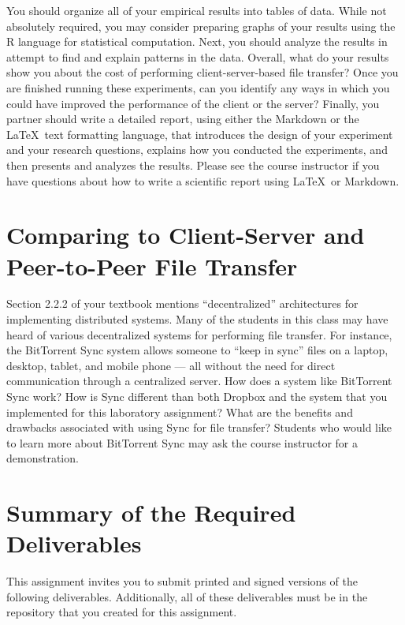You should organize all of your empirical results into tables of data. While not absolutely required, you may consider
preparing graphs of your results using the R language for statistical computation. Next, you should analyze the results
in attempt to find and explain patterns in the data. Overall, what do your results show you about the cost of performing
client-server-based file transfer? Once you are finished running these experiments, can you identify any ways in which
you could have improved the performance of the client or the server? Finally, you partner should write a detailed
report, using either the Markdown or the \LaTeX~text formatting language, that introduces the design of your experiment
and your research questions, explains how you conducted the experiments, and then presents and analyzes the results.
Please see the course instructor if you have questions about how to write a scientific report using \LaTeX~or Markdown.

\section*{Comparing to Client-Server and Peer-to-Peer File Transfer}

Section 2.2.2 of your textbook mentions ``decentralized'' architectures for implementing distributed systems. Many of
the students in this class may have heard of various decentralized systems for performing file transfer. For instance,
the BitTorrent Sync system allows someone to ``keep in sync'' files on a laptop, desktop, tablet, and mobile phone ---
all without the need for direct communication through a centralized server. How does a system like BitTorrent Sync work?
How is Sync different than both Dropbox and the system that you implemented for this laboratory assignment? What are the
benefits and drawbacks associated with using Sync for file transfer? Students who would like to learn more about
BitTorrent Sync may ask the course instructor for a demonstration.

\section*{Summary of the Required Deliverables}

This assignment invites you to submit printed and signed versions of the following deliverables. Additionally,
all of these deliverables must be in the repository that you created for this assignment.

